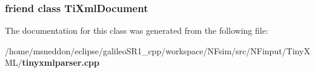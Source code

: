 \subsubsection{\setlength{\rightskip}{0pt plus 5cm}friend class {\bf TiXmlDocument}\hspace{0.3cm}{\tt  [friend]}}\label{classTiXmlParsingData_173617f6dfe902cf484ce5552b950475}




The documentation for this class was generated from the following file:\begin{CompactItemize}
\item 
/home/msneddon/eclipse/galileoSR1\_\-cpp/workspace/NFsim/src/NFinput/TinyXML/{\bf tinyxmlparser.cpp}\end{CompactItemize}
